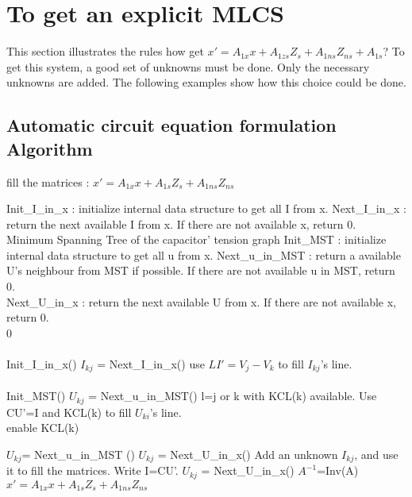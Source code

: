  

\section{To get an explicit MLCS}

This section illustrates the rules how get $x' = A_{1x}x +A_{1zs}Z_{s} + A_{1ns}Z_{ns}+A_{1s}$? To get this system, a good set of unknowns must be done. Only the necessary unknowns are added. The
following examples show how this choice could be done.





\subsection{Automatic circuit equation formulation Algorithm}

\begin{algorithm}
\caption{fill the matrices : $x'=A_{1x}x+A_{1s}Z_{s}+A_{1ns}Z_{ns}$ }
\begin{algorithmic}
\REQUIRE Init\_I\_in\_x : initialize internal data structure to get all I from x.
\REQUIRE Next\_I\_in\_x : return the next available I from x. If there are not available x, return 0.\\
\REQUIRE Minimum Spanning Tree of the capacitor' tension graph
\REQUIRE Init\_MST : initialize internal data structure to get all u from x.
\REQUIRE Next\_u\_in\_MST : return a available U's neighbour from MST if possible. If there are not
available u in MST, return 0.\\
\REQUIRE Next\_U\_in\_x : return the next available U from x. If there are not available x, return 0.\\

0\\
\\
\STATE Init\_I\_in\_x()
\STATE $I_{kj}$ = Next\_I\_in\_x()
\STATE use $LI'=V_{j}-V_{k}$ to fill $I_{kj}$'s line.
\ENDWHILE\\
\\
\STATE Init\_MST()
\STATE $U_{kj}$ = Next\_u\_in\_MST()
\STATE l=j or k with KCL(k) available.
\STATE Use CU'=I and KCL(k) to fill $U_{ki}$'s line.\\
\STATE enable KCL(k)

\STATE $U_{kj}$= Next\_u\_in\_MST ()
\ENDWHILE
\STATE $U_{kj}$ = Next\_U\_in\_x()
\STATE Add an unknown $I_{kj}$, and use it to fill the matrices. Write I=CU'.
\STATE $U_{kj}$ = Next\_U\_in\_x()
\ENDWHILE
{}
\STATE $A^{-1}$=Inv(A)
\STATE $x'=A_{1x}x+A_{1s}Z_{s}+A_{1ns}Z_{ns}$
\end{algorithmic}
\end{algorithm}



